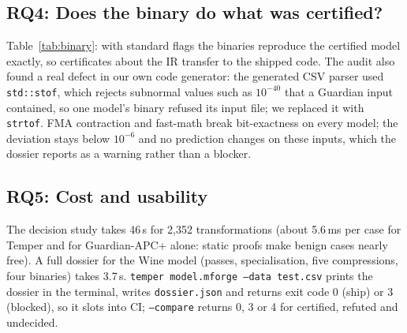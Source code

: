 \documentclass[conference]{IEEEtran}
\begin{document}
\subsection{RQ4: Does the binary do what was certified?}
\begin{table}[t]
\centering
\caption{Generated C++ of 8 real models vs the certified model (test rows and Guardian inputs, 173 to 844 per model).}
\label{tab:binary}
\setlength{\tabcolsep}{4pt}
\end{table}
Table~\ref{tab:binary}: with standard flags the binaries reproduce the certified model exactly, so certificates about the IR transfer to the shipped code. The audit also found a real defect in our own code generator: the generated CSV parser used \texttt{std::stof}, which rejects subnormal values such as $10^{-40}$ that a Guardian input contained, so one model's binary refused its input file; we replaced it with \texttt{strtof}. FMA contraction and fast-math break bit-exactness on every model; the deviation stays below $10^{-6}$ and no prediction changes on these inputs, which the dossier reports as a warning rather than a blocker.

\subsection{RQ5: Cost and usability}
The decision study takes 46\,s for 2{,}352 transformations (about 5.6\,ms per case for Temper and for Guardian-APC+ alone: static proofs make benign cases nearly free). A full dossier for the Wine model (passes, specialisation, five compressions, four binaries) takes 3.7\,s. \texttt{temper model.mforge --data test.csv} prints the dossier in the terminal, writes \texttt{dossier.json} and returns exit code 0 (ship) or 3 (blocked), so it slots into CI; \texttt{--compare} returns 0, 3 or 4 for certified, refuted and undecided.
\end{document}
